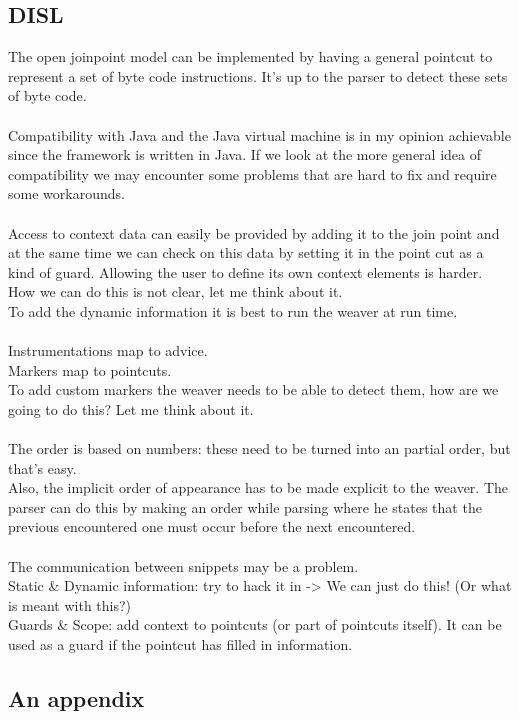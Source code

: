 \documentclass[a4paper]{report}
\begin{document}
\section{DISL}
The open joinpoint model can be implemented by having a general pointcut to represent a set of byte code instructions. It's up to the parser to detect these sets of byte code.\\
\\
Compatibility with Java and the Java virtual machine is in my opinion achievable since the framework is written in Java. If we look at the more general idea of compatibility we may encounter some problems that are hard to fix and require some workarounds.\\
\\
Access to context data can easily be provided by adding it to the join point and at the same time we can check on this data by setting it in the point cut as a kind of guard. Allowing the user to define its own context elements is harder. How we can do this is not clear, let me think about it.\\
To add the dynamic information it is best to run the weaver at run time.\\
\\
Instrumentations map to advice.\\
Markers map to pointcuts.\\
To add custom markers the weaver needs to be able to detect them, how are we going to do this? Let me think about it.\\
\\
The order is based on numbers: these need to be turned into an partial order, but that's easy.\\
Also, the implicit order of appearance has to be made explicit to the weaver. The parser can do this by making an order while parsing where he states that the previous encountered one must occur before the next encountered.\\
\\
The communication between snippets may be a problem.\\
Static \& Dynamic information: try to hack it in -> We can just do this! (Or what is meant with this?)\\
Guards \& Scope: add context to pointcuts (or part of pointcuts itself). It can be used as a guard if the pointcut has filled in information.

\backpages
\begin{appendices}
\chapter{An appendix}
\label{chapt:appendix}

\end{appendices}

%
%  
\end{document}
